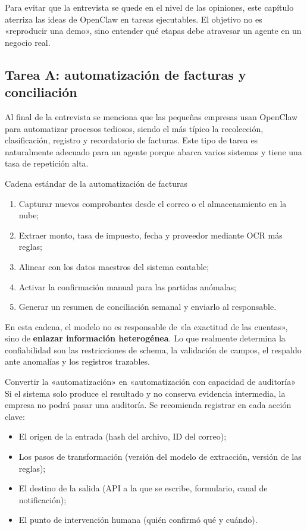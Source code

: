 \documentclass[a4paper]{article}
\begin{document}
Para evitar que la entrevista se quede en el nivel de las opiniones, este capítulo aterriza las ideas de OpenClaw en tareas ejecutables. El objetivo no es «reproducir una demo», sino entender qué etapas debe atravesar un agente en un negocio real.

\subsection{Tarea A: automatización de facturas y conciliación}

Al final de la entrevista se menciona que las pequeñas empresas usan OpenClaw para automatizar procesos tediosos, siendo el más típico la recolección, clasificación, registro y recordatorio de facturas. Este tipo de tarea es naturalmente adecuado para un agente porque abarca varios sistemas y tiene una tasa de repetición alta.

\begin{knowledgebox}{Cadena estándar de la automatización de facturas}
\begin{enumerate}
    \item Capturar nuevos comprobantes desde el correo o el almacenamiento en la nube;
    \item Extraer monto, tasa de impuesto, fecha y proveedor mediante OCR más reglas;
    \item Alinear con los datos maestros del sistema contable;
    \item Activar la confirmación manual para las partidas anómalas;
    \item Generar un resumen de conciliación semanal y enviarlo al responsable.
\end{enumerate}
\end{knowledgebox}

En esta cadena, el modelo no es responsable de «la exactitud de las cuentas», sino de \textbf{enlazar información heterogénea}. Lo que realmente determina la confiabilidad son las restricciones de schema, la validación de campos, el respaldo ante anomalías y los registros trazables.

\begin{importantbox}{Convertir la «automatización» en «automatización con capacidad de auditoría»}
Si el sistema solo produce el resultado y no conserva evidencia intermedia, la empresa no podrá pasar una auditoría. Se recomienda registrar en cada acción clave:
\begin{itemize}
    \item El origen de la entrada (hash del archivo, ID del correo);
    \item Los pasos de transformación (versión del modelo de extracción, versión de las reglas);
    \item El destino de la salida (API a la que se escribe, formulario, canal de notificación);
    \item El punto de intervención humana (quién confirmó qué y cuándo).
\end{itemize}
\end{importantbox}
\end{document}
